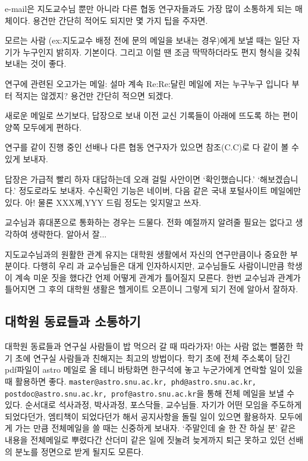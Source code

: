 e-mail은 지도교수님 뿐만 아니라 다른 협동 연구자들과도 가장 많이 소통하게 되는
매체이다. 용건만 간단히 적어도 되지만 몇 가지 팁을 주자면.
\begin{packed_item}
\item 모르는 사람 (ex:지도교수 배정 전에 문의 메일을 보내는 경우)에게 보낼 때는
  일단 자기가 누구인지 밝히자. 기본이다. 그리고 이럴 땐 조금 딱딱하더라도 편지
  형식을 갖춰 보내는 것이 좋다.
\item 연구에 관련된 오고가는 메일: 설마 계속 Re:Re:달린 메일에 저는 누구누구
  입니다 부터 적지는 않겠지? 용건만 간단히 적으면 되겠다.
\item 새로운 메일로 쓰기보다, 답장으로 보내 이전 교신 기록들이 아래에 뜨도록 하는
  편이 양쪽 모두에게 편하다.
\item 연구를 같이 진행 중인 선배나 다른 협동 연구자가 있으면 참조(C.C)로 다 같이
  볼 수 있게 보내자.
\item 답장은 가급적 빨리 하자 대답하는데 오래 걸릴 사안이면 ‘확인했습니다.’
  ‘해보겠습니다.’ 정도로라도 보내자. 수신확인 기능은 네이버, 다음 같은 국내
  포털사이트 메일에만 있다. 아! 물론 XXX께,YYY 드림 정도는 잊지말고 쓰자.
\end{packed_item}
교수님과 휴대폰으로 통화하는 경우는 드물다. 전화 예절까지 알려줄 필요는 없다고
생각하여 생략한다. 알아서 잘...

지도교수님과의 원활한 관계 유지는 대학원 생활에서 자신의 연구만큼이나 중요한
부분이다. 다행히 우리 과 교수님들은 대게 인자하시지만, 교수님들도 사람이니만큼
학생이 계속 미운 짓을 했다간 언제 어떻게 관계가 틀어질지 모른다. 한번 교수님과
관계가 틀어지면 그 후의 대학원 생활은 헬게이트 오픈이니 그렇게 되기 전에 알아서
잘하자.

\subsection{대학원 동료들과 소통하기}
대학원 동료들과 연구실 사람들이 밥 먹으러 갈 때 따라가자! 아는 사람 없는 뻘쭘한
학기 초에 연구실 사람들과 친해지는 최고의 방법이다. 학기 초에 전체 주소록이 담긴
pdf파일이 astro 메일로 올 테니 바탕화면 한구석에 놓고 누군가에게 연락할 일이 있을
때 활용하면 좋다. \texttt{master@astro.snu.ac.kr, phd@astro.snu.ac.kr,
postdoc@astro.snu.ac.kr, prof@astro.snu.ac.kr}을 통해 전체 메일을 보낼 수
있다. 순서대로 석사과정, 박사과정, 포스닥들, 교수님들. 자기가 어떤 모임을
주도하게 되었다던가, 엠티책이 되었다던가 해서 공지사항을 돌릴 일이 있으면
활용하자. 모두에게 가는 만큼 전체메일을 쓸 때는 신중하게 보내자. ‘주말인데 술 한
잔 하실 분’ 같은 내용을 전체메일로 뿌렸다간 산더미 같은 일에 짓눌려 늦게까지 퇴근
못하고 있던 선배의 분노를 정면으로 받게 될지도 모른다.


